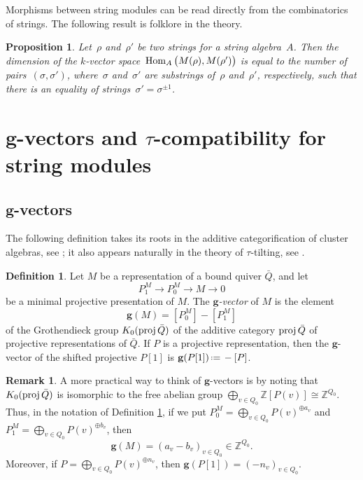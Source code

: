 \documentclass{amsart}
\newtheorem{proposition}[theorem]{Proposition}
\theoremstyle{definition}
\newtheorem{definition}[theorem]{Definition}
\newtheorem{remark}[theorem]{Remark}
\newcommand{\Z}{\mathbb{Z}} %
\renewcommand{\b}[1]{\mathbf{#1}} %
\newcommand{\eqdef}{\mbox{\,\raisebox{0.2ex}{\scriptsize\ensuremath{\mathrm:}}\ensuremath{=}\,}} %
\newcommand{\darkblue}{\color{darkblue}} %
\newcommand{\defn}[1]{\textsl{\darkblue #1}} %
\newcommand{\Hom}[1]{\operatorname{{\rm Hom}}_{#1}}
\newcommand{\proj}{\operatorname{{\rm proj}}}
\begin{document}
Morphisms between string modules can be read directly from the combinatorics of strings.  The following result is folklore in the theory.

\begin{proposition}
\label{prop:morphismsStringModules}
Let~$\rho$ and~$\rho'$ be two strings for a string algebra~$A$.
Then the dimension of the $k$-vector space~$\Hom{A} \big( M(\rho), M(\rho') \big)$ is equal to the number of pairs~$(\sigma, \sigma')$, where~$\sigma$ and~$\sigma'$ are substrings of~$\rho$ and~$\rho'$, respectively, such that there is an equality of strings~$\sigma' = \sigma^{\pm 1}$.

\end{proposition}


\section{$\b{g}$-vectors and $\tau$-compatibility for string modules}
\label{sec:stringModules}

\subsection{$\b{g}$-vectors}
\label{subsec:gvectors}

The following definition takes its roots in the additive categorification of cluster algebras, see \cite{DehyKeller};
it also appears naturally in the theory of $\tau$-tilting, see \cite[Sect.~5.1]{AdachiIyamaReiten}.

\begin{definition}
\label{definition: g-vector of representation}
 Let $M$ be a representation of a bound quiver $\bar Q$, and let
 \[
  P^M_1 \to P^M_0 \to M \to 0
 \]
 be a minimal projective presentation of $M$.  
 The \defn{$\b{g}$-vector} of $M$ is the element 
 \[
  \b{g}(M) = [P_0^M­] - [P_1^M]
 \]
 of the Grothendieck group $K_0(\proj \bar Q)$ of the additive category $\proj \bar Q$ of projective representations of $\bar Q$. 
 If $P$ is a projective representation, then the $\b{g}$-vector of the shifted projective $P[1]$ is $\b{g}(P[1]) \eqdef -[P]$.
\end{definition}

\begin{remark}
 A more practical way to think of $\b{g}$-vectors is by noting that $K_0(\proj \bar Q)$ is isomorphic to the free abelian group
 $\bigoplus_{v\in Q_0} \Z [P(v)] \cong \Z^{Q_0}$.  Thus, in the notation of Definition \ref{definition: g-vector of representation},
 if we put $P_0^M = \bigoplus_{v\in Q_0}P(v)^{\oplus a_v}$ and $P_1^M = \bigoplus_{v\in Q_0}P(v)^{\oplus b_v}$, 
 then
 \[
  \b{g}(M) = (a_v - b_v)_{v\in Q_0} \in \Z^{Q_0}.
 \] 
 Moreover, if $P = \bigoplus_{v\in Q_0}P(v)^{\oplus n_v}$, then $\b{g}(P[1]) = (-n_v)_{v\in Q_0}$.
\end{remark}
\end{document}
